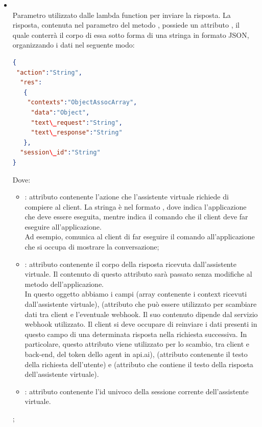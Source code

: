 \begin{itemize}
\begin{itemize}
\begin{itemize}
\begin{lstlisting}[language=json,firstnumber=1]
{
    "app":"nome\_applicazione",
    "query": "VAQuery"
}
\end{lstlisting}

con  stringa che corrisponde al nome dell'applicazione che manda la richiesta, e  oggetto del tipo  contenente i dati relativi alla query da mandare all'assistente virtuale;
			\item {} \\
			Parametro utilizzato dalle lambda function per inviare la risposta. La risposta, contenuta nel  parametro del metodo , possiede un attributo , il quale conterrà il corpo di essa sotto forma di una stringa in formato JSON, organizzando i dati nel seguente modo:
 \begin{lstlisting}[language=json,firstnumber=1]
{
 "action":"String",
  "res":
   {
    "contexts":"ObjectAssocArray",
     "data":"Object",
     "text\_request":"String",
     "text\_response":"String"
   },
  "session\_id":"String"
}
\end{lstlisting}
Dove:
\begin{itemize}
   \item {}: attributo contenente l'azione che l'assistente virtuale richiede di compiere al client. La stringa è nel formato , dove  indica l'applicazione che deve essere   eseguita, mentre  indica il comando che il client deve far eseguire all'applicazione. \\ Ad esempio,  comunica al client di far eseguire il comando  all'applicazione che si occupa di mostrare la conversazione;
   \item {}: attributo contenente il corpo della risposta ricevuta dall'assistente virtuale. Il contenuto di questo attributo sarà passato senza modifiche al metodo  dell'applicazione.\\ In questo oggetto abbiamo i campi  (array contenente i context ricevuti dall'assistente virtuale),  (attributo che può essere utilizzato per scambiare dati tra client e l'eventuale webhook. Il suo contenuto dipende dal servizio webhook utilizzato. Il client si deve occupare di reinviare i dati presenti in questo campo  di una determinata risposta nella richiesta successiva. In particolare, questo attributo viene utilizzato per lo scambio, tra client e back-end, del token dello agent in api.ai),  (attributo contenente il testo della richiesta dell'utente) e (attributo che contiene il testo della risposta dell'assistente virtuale).
   \item {}: attributo contenente l'id univoco della sessione corrente dell'assistente virtuale.
\end{itemize}
;
		\end{itemize}
	\end{itemize}
\end{itemize}

